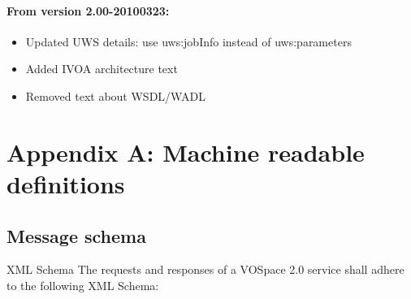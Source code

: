 \documentclass[11pt,a4paper]{ivoa}
\begin{document}
\paragraph{From version 2.00-20100323:}
\begin{itemize}
    \item Updated UWS details: use uws:jobInfo instead of uws:parameters
    \item Added IVOA architecture text
    \item Removed text about WSDL/WADL
\end{itemize}

\section{Appendix A: Machine readable definitions}
\subsection{Message schema}
XML Schema
The requests and responses of a VOSpace 2.0 service shall adhere to the following XML Schema:
\end{document}
